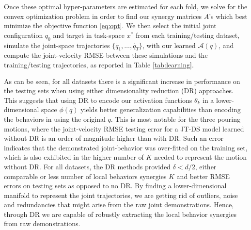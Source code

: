 \documentclass[letterpaper, 10 pt, conference,fleqn]{ieeeconf}
\begin{document}
Once these optimal hyper-parameters are estimated for each fold, we solve for the convex optimization problem in order to find our synergy matrices $A$'s which best minimize the objective function \eqref{eq:opt}. We then select the initial joint configuration $q_0$ and target in task-space $x^*$ from each training/testing dataset, simulate the joint-space trajectories $\{\dot{q_1},\dots,\dot{q_T}\}$, with our learned $\mathcal{A}(q)$, and compute the joint-velocity RMSE between these simulations and the training/testing trajectories, as reported in Table \ref{tab:learning}.

As can be seen, for all datasets there is a significant increase in performance on the testing sets when using either dimensionality reduction (DR) approaches. This suggests that using DR to encode our activation functions $\theta_k$ in a lower-dimensional space $\phi(q)$ yields better generalization capabilities than encoding the behaviors in using the original $q$. This is most notable for the three pouring motions, where the joint-velocity RMSE testing error for a JT-DS model learned without DR is an order of magnitude higher than with DR. Such an error indicates that the demonstrated joint-behavior was over-fitted on the training set, which is also exhibited in the higher number of $K$ needed to represent the motion without DR. For all datasets, the DR methods provided $\delta < d/2$, either comparable or less number of local behaviors synergies $K$ and better RMSE errors on testing sets as opposed to no DR. By finding a lower-dimensional manifold to represent the joint trajectories, we are getting rid of outliers, noise and redundancies that might arise from the raw joint demonstrations. Hence, through DR we are capable of robustly extracting the local behavior synergies from raw demonstrations. 
\end{document}
